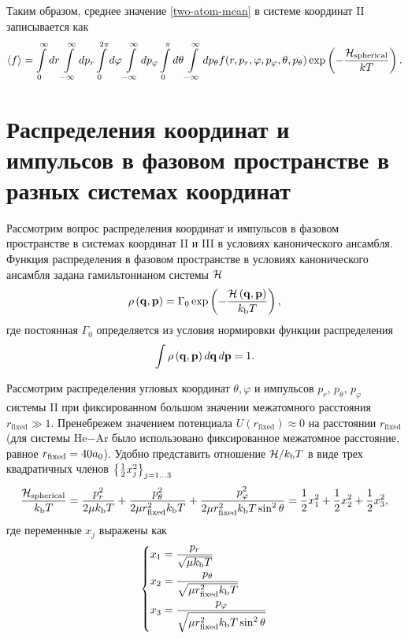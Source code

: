 Таким образом, среднее значение \eqref{two-atom-mean} в системе координат II записывается как
\begin{gather}
    \langle f \rangle = \int\limits_0^\infty dr \int\limits_{-\infty}^\infty dp_r \int\limits_0^{2\pi} d\varphi \int\limits_{-\infty}^\infty dp_\varphi \int\limits_0^\pi d\theta \int\limits_{-\infty}^\infty dp_\theta f(r, p_r, \varphi, p_\varphi, \theta, p_\theta) \exp \left( -\frac{\mathcal{H}_\text{spherical}}{k T} \right). \label{two-atom-mean-spherical}
\end{gather}

\section{Распределения координат и импульсов в фазовом пространстве в разных системах координат} \label{section:two-atom-distributions} 

Рассмотрим вопрос распределения координат и импульсов в фазовом пространстве в системах координат II и III в условиях канонического ансамбля. Функция распределения в фазовом пространстве в условиях канонического ансамбля задана гамильтонианом системы $\mathcal{H}$ \cite{hill} 
\begin{gather}
    \rho \left( \mathbf{q}, \mathbf{p} \right) = \Gamma_0 \exp \left( -\frac{\mathcal{H} \left( \mathbf{q}, \mathbf{p} \right)}{k_\text{b} T} \right),
\end{gather}
% 
где постоянная $\Gamma_0$ определяется из условия нормировки функции распределения
\begin{gather}
    \int \rho \left( \mathbf{q}, \mathbf{p} \right) d \mathbf{q} \, d\mathbf{p} = 1.
\end{gather}

Рассмотрим распределения угловых координат $\theta, \varphi$ и импульсов $p_r$, $p_\theta$, $p_\varphi$ системы II при фиксированном большом значении межатомного расстояния $r_\text{fixed} \gg 1$. Пренебрежем значением потенциала $U(r_\text{fixed}) \approx 0$ на расстоянии $r_\text{fixed}$ (для системы He$-$Ar было использовано фиксированное межатомное расстояние, равное $r_\text{fixed} = 40 a_0$). Удобно представить отношение $\mathcal{H} / k_\text{b} T$ в виде трех квадратичных членов $\left\{ \frac{1}{2} x_j^2 \right\}_{j = 1 \dots 3}$
\begin{gather}
    \frac{\mathcal{H}_\text{spherical}}{k_\text{b} T} = \frac{p_r^2}{2 \mu k_\text{b} T} + \frac{p_\theta^2}{2 \mu r_\text{fixed}^2 k_\text{b} T} + \frac{p_\varphi^2}{2 \mu r_\text{fixed}^2 k_\text{b} T \sin^2 \theta} = \frac{1}{2} x_1^2 + \frac{1}{2} x_2^2 + \frac{1}{2} x_3^2, \label{two-atom-spherical-hamiltonian-xs} 
\end{gather}
%
где переменные $x_j$ выражены как
\begin{gather}
    \left\{
    \begin{aligned}
        x_1 &= \frac{p_r}{\sqrt{\mu k_\text{b} T}} \\
        x_2 &= \frac{p_\theta}{\sqrt{\mu r_\text{fixed}^2 k_\text{b} T}} \\
        x_3 &= \frac{p_\varphi}{\sqrt{\mu r_\text{fixed}^2 k_\text{b} T \sin^2 \theta}}
    \end{aligned}
\right. \label{two-atom-xs}
\end{gather}

